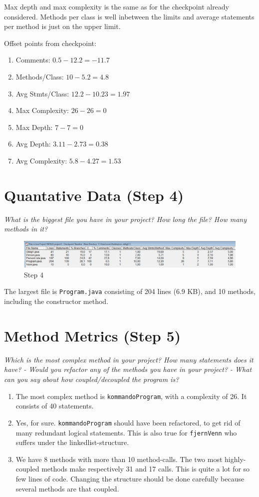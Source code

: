 \documentclass{article}
\begin{document}
Max depth and max complexity is the same as for the checkpoint already considered. Methods per class is well inbetween the limits and average statements 
per method is just on the upper limit.

Offset points from checkpoint:
\begin{enumerate}
 \item Comments: $0.5 - 12.2 = -11.7$
 \item Methods/Class: $10 - 5.2 = 4.8$
 \item Avg Stmts/Class: $12.2 - 10.23 = 1.97$
 \item Max Complexity: $26 - 26 = 0$
 \item Max Depth: $7 - 7 = 0$
 \item Avg Depth: $3.11 - 2.73 = 0.38$
 \item Avg Complexity: $5.8 - 4.27 = 1.53$
\end{enumerate}



\section{Quantative Data (Step 4)}
\textit{What is the biggest file you have in your project? How long the file? How many methods in it?}

\begin{figure}
\centerline{ 
 \includegraphics[scale=0.35]{step4}
}
\caption{Step 4}
\end{figure}

The largest file is \texttt{Program.java} consisting of 204 lines (6.9 KB), and 10 methods, including the constructor method. \\

\section{Method Metrics (Step 5)}
\textit{Which is the most complex method in your project? How many statements does it have? - Would you refactor any of the methods you have in your project?
- What can you say about how coupled/decoupled the program is?}

\begin{enumerate}
 \item The most complex method is \texttt{kommandoProgram}, with a complexity of 26. It consists of 40 statements. 
 \item Yes, for sure. \texttt{kommandoProgram} should have been refactored, to get rid of many redundant logical statements. This is also true for 
 \texttt{fjernVenn} who suffers under the linkedlist-structure.
 \item We have 8 methods with more than 10 method-calls. The two most highly-coupled methods make respectively 31 and 17 calls. This is quite a lot 
 for so few lines of code. Changing the structure should be done carefully because several methods are that coupled.
\end{enumerate}
\end{document}
